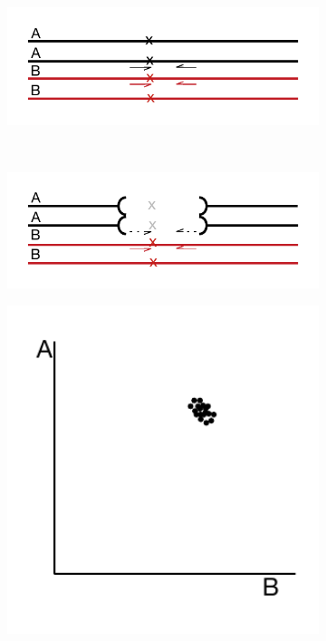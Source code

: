 \begin{figure}
    \centering
    \begin{subfigure}[b]{0.45\textwidth}
        \caption{}
        \includegraphics[width=1\textwidth]{PolyMarker/Figures/deletions/wt.pdf}
        \label{fig:poly:wt}
    \end{subfigure}
    ~
     \begin{subfigure}[b]{0.45\textwidth}
        \caption{}
        \includegraphics[width=1\textwidth]{PolyMarker/Figures/deletions/homM4.pdf}
        \label{fig:poly:homM4}
    \end{subfigure}
    \begin{subfigure}[b]{0.3\textwidth}
        \caption{}
        \includegraphics[width=1\textwidth]{PolyMarker/Figures/deletions/homFalse.pdf}

\end{subfigure}
\end{figure}
